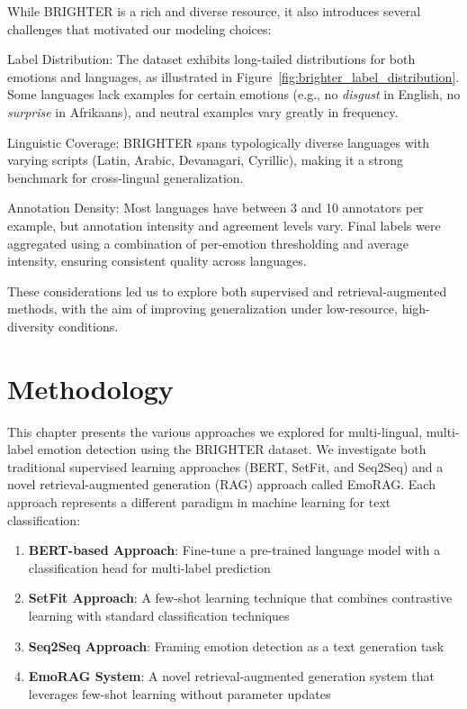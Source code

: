 \documentclass[a4paper,12pt]{extarticle}
\begin{document}
While BRIGHTER is a rich and diverse resource, it also introduces several challenges that motivated our modeling choices:

Label Distribution: The dataset exhibits long-tailed distributions for both emotions and languages, as illustrated in Figure~\ref{fig:brighter_label_distribution}. Some languages lack examples for certain emotions (e.g., no \textit{disgust} in English, no \textit{surprise} in Afrikaans), and neutral examples vary greatly in frequency.

Linguistic Coverage: BRIGHTER spans typologically diverse languages with varying scripts (Latin, Arabic, Devanagari, Cyrillic), making it a strong benchmark for cross-lingual generalization.

Annotation Density: Most languages have between 3 and 10 annotators per example, but annotation intensity and agreement levels vary. Final labels were aggregated using a combination of per-emotion thresholding and average intensity, ensuring consistent quality across languages.

These considerations led us to explore both supervised and retrieval-augmented methods, with the aim of improving generalization under low-resource, high-diversity conditions.

\section{Methodology}

This chapter presents the various approaches we explored for multi-lingual, multi-label emotion detection using the BRIGHTER dataset. We investigate both traditional supervised learning approaches (BERT, SetFit, and Seq2Seq) and a novel retrieval-augmented generation (RAG) approach called EmoRAG. Each approach represents a different paradigm in machine learning for text classification:

\begin{enumerate}
\item \textbf{BERT-based Approach}: Fine-tune a pre-trained language model with a classification head for multi-label prediction
\item \textbf{SetFit Approach}: A few-shot learning technique that combines contrastive learning with standard classification techniques
\item \textbf{Seq2Seq Approach}: Framing emotion detection as a text generation task
\item \textbf{EmoRAG System}: A novel retrieval-augmented generation system that leverages few-shot learning without parameter updates
\end{enumerate}
\end{document}
